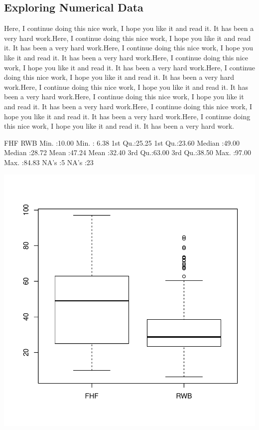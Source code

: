 \documentclass[11pt]{article}
\begin{document}
\subsection{Exploring Numerical Data}\label{numexplo}

Here, I continue doing this nice work, I hope you like it and read it. It has been a very hard work.Here, I continue doing this nice work, I hope you like it and read it. It has been a very hard work.Here, I continue doing this nice work, I hope you like it and read it. It has been a very hard work.Here, I continue doing this nice work, I hope you like it and read it. It has been a very hard work.Here, I continue doing this nice work, I hope you like it and read it. It has been a very hard work.Here, I continue doing this nice work, I hope you like it and read it. It has been a very hard work.Here, I continue doing this nice work, I hope you like it and read it. It has been a very hard work.Here, I continue doing this nice work, I hope you like it and read it. It has been a very hard work.Here, I continue doing this nice work, I hope you like it and read it. It has been a very hard work.

\begin{Schunk}
\begin{Soutput}
      FHF             RWB       
 Min.   :10.00   Min.   : 6.38  
 1st Qu.:25.25   1st Qu.:23.60  
 Median :49.00   Median :28.72  
 Mean   :47.24   Mean   :32.40  
 3rd Qu.:63.00   3rd Qu.:38.50  
 Max.   :97.00   Max.   :84.83  
 NA's   :5       NA's   :23     
\end{Soutput}
\end{Schunk}

\includegraphics{PaperInR_3-num_plot}
\end{document}
